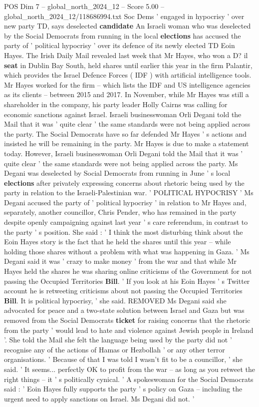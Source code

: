 \begin{textsample}{POS Dim 7 – global\_north\_2024\_12 – Score 5.00 – global\_north\_2024\_12/118686994.txt}  \label{ex:f7_pos_296}
Soc Dems ' engaged in hypocrisy ' over new party TD, says deselected \textbf{candidate} An Israeli woman who was deselected by the Social Democrats from running in the local \textbf{elections} has accused the party of ' political hypocrisy ' over its defence of its newly elected TD Eoin Hayes.
The Irish Daily Mail revealed last week that Mr Hayes, who won a D? il \textbf{seat} in Dublin Bay South, held shares until earlier this year in the firm Palantir, which provides the Israel Defence Forces ( IDF ) with artificial intelligence tools.
Mr Hayes worked for the firm -- which lists the IDF and US intelligence agencies as its clients -- between 2015 and 2017.
In November, while Mr Hayes was still a shareholder in the company, his party leader Holly Cairns was calling for economic sanctions against Israel.
Israeli businesswoman Orli Degani told the Mail that it was ' quite clear ' the same standards were not being applied across the party.
The Social Democrats have so far defended Mr Hayes ' s actions and insisted he will be remaining in the party.
Mr Hayes is due to make a statement today.
However, Israeli businesswoman Orli Degani told the Mail that it was ' quite clear ' the same standards were not being applied across the party.
Ms Degani was deselected by Social Democrats from running in June ' s local \textbf{elections} after privately expressing concerns about rhetoric being used by the party in relation to the Israeli-Palestinian war. ' POLITICAL HYPOCRISY ' Ms Degani accused the party of ' political hypocrisy ' in relation to Mr Hayes and, separately, another councillor, Chris Pender, who has remained in the party despite openly campaigning against last year ' s care referendum, in contrast to the party ' s position.
She said : ' I think the most disturbing think about the Eoin Hayes story is the fact that he held the shares until this year -- while holding those shares without a problem with what was happening in Gaza. ' Ms Degani said it was ' crazy to make money ' from the war and that while Mr Hayes held the shares he was sharing online criticisms of the Government for not passing the Occupied Territories \textbf{Bill}. ' If you look at his Eoin Hayes ' s Twitter account he is retweeting criticisms about not passing the Occupied Territories \textbf{Bill}.
It is political hypocrisy, ' she said.
REMOVED Ms Degani said she advocated for peace and a two-state solution between Israel and Gaza but was removed from the Social Democrats \textbf{ticket} for raising concerns that the rhetoric from the party ' would lead to hate and violence against Jewish people in Ireland '.
She told the Mail she felt the language being used by the party did not ' recognise any of the actions of Hamas or Hezbollah ' or any other terror organisations. ' Because of that I was told I wasn't fit to be a councillor, ' she said. ' It seems... perfectly OK to profit from the war -- as long as you retweet the right things -- it ' s politically cynical. ' A spokeswoman for the Social Democrats said : ' Eoin Hayes fully supports the party ' s policy on Gaza -- including the urgent need to apply sanctions on Israel.
Ms Degani did not. '


\end{textsample}
